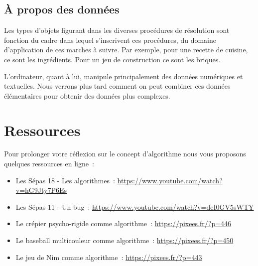 		\subsection{À propos des données}
		
			Les types d’objets figurant 
			dans les diverses procédures de résolution
			sont fonction du cadre 
			dans lequel s’inscrivent ces procédures, 
			du domaine d’application de ces marches à suivre. 
			Par exemple, pour une recette de cuisine, 
			ce sont les ingrédients. 
			Pour un jeu de construction ce sont les briques.
			
			L’ordinateur, quant à lui, manipule principalement
			des données numériques et textuelles. 
			Nous verrons plus tard 
			comment on peut combiner ces données élémentaires 
			pour obtenir des données plus complexes.
	
	\section{Ressources}
	
		Pour prolonger votre réflexion sur le concept d’algorithme
		nous vous proposons quelques ressources en ligne~:
		\begin{itemize}
		\item
			Les Sépas 18 - Les algorithmes~:
			\url{https://www.youtube.com/watch?v=hG9Jty7P6Es}
		\item
			Les Sépas 11 - Un bug~:
			\url{https://www.youtube.com/watch?v=deI0GV5sWTY}
		\item
			Le crépier psycho-rigide comme algorithme~:
			\url{https://pixees.fr/?p=446}
		\item
			Le baseball multicouleur comme algorithme~:
			\url{https://pixees.fr/?p=450}
		\item
			Le jeu de Nim comme algorithme~:
			\url{https://pixees.fr/?p=443}
		\end{itemize}
		
